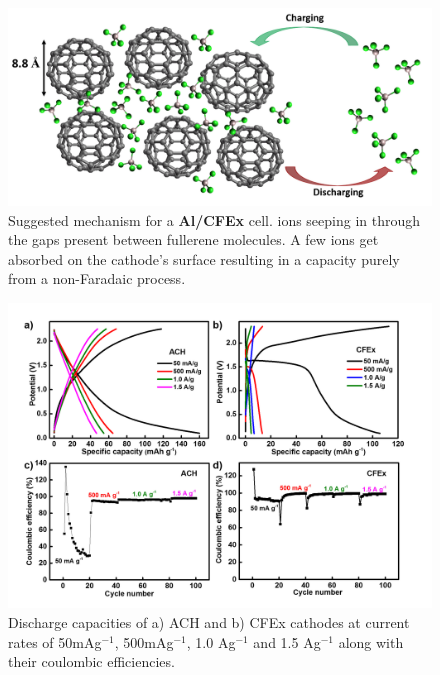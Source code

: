 \documentclass{article}
\begin{document}
 \begin{figure}[tbh!]
  \centering
  \includegraphics[width=\textwidth]{figures/CFExmech}
    \caption{Suggested mechanism for a \textbf{Al/CFEx} cell.  ions seeping in through the gaps present between fullerene molecules. A few  ions get absorbed on the cathode's surface resulting in a capacity purely from a non-Faradaic process.}
  \label{figures:CFExmech}
\end{figure}

\begin{figure}[tbh!]
  \centering
  \includegraphics[width=\textwidth]{figures/CFExACHlong}
    \caption{Discharge capacities of a) ACH and b) CFEx cathodes at current rates of 50mAg$^{-1}$, 500mAg$^{-1}$, 1.0 Ag$^{-1}$ and 1.5 Ag$^{-1}$ along with their coulombic efficiencies. }
  \label{figures:CFExACHlong}
\end{figure}

\end{document}
